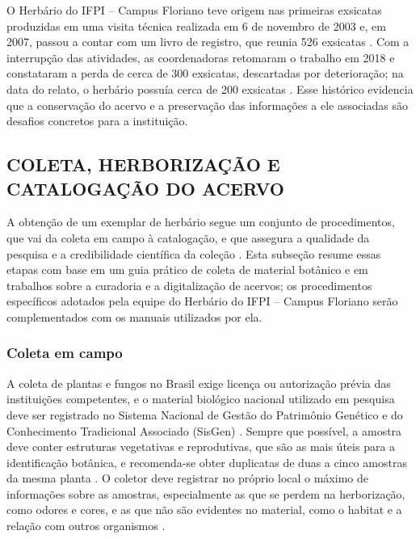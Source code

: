\documentclass[
    12pt,        %
    openany,     %
    oneside,     %
    a4paper,     %
    english,     %
    french,      %
    spanish,     %
    brazil,      %
    article      %
]{abntex2}
\begin{document}
O Herbário do IFPI -- Campus Floriano teve origem nas primeiras exsicatas produzidas em uma visita técnica realizada em 6 de novembro de 2003 e, em 2007, passou a contar com um livro de registro, que reunia 526 exsicatas \cite{lopes2023herbario}. Com a interrupção das atividades, as coordenadoras retomaram o trabalho em 2018 e constataram a perda de cerca de 300 exsicatas, descartadas por deterioração; na data do relato, o herbário possuía cerca de 200 exsicatas \cite{lopes2023herbario}. Esse histórico evidencia que a conservação do acervo e a preservação das informações a ele associadas são desafios concretos para a instituição.

\subsection{COLETA, HERBORIZAÇÃO E CATALOGAÇÃO DO ACERVO} 
\label{subsec:coleta-catalogacao}


A obtenção de um exemplar de herbário segue um conjunto de procedimentos, que vai da coleta em campo à catalogação, e que assegura a qualidade da pesquisa e a credibilidade científica da coleção \cite{freitas2021coleta}. Esta subseção resume essas etapas com base em um guia prático de coleta de material botânico e em trabalhos sobre a curadoria e a digitalização de acervos; os procedimentos específicos adotados pela equipe do Herbário do IFPI -- Campus Floriano serão complementados com os manuais utilizados por ela.

\subsubsection{Coleta em campo}

A coleta de plantas e fungos no Brasil exige licença ou autorização prévia das instituições competentes, e o material biológico nacional utilizado em pesquisa deve ser registrado no Sistema Nacional de Gestão do Patrimônio Genético e do Conhecimento Tradicional Associado (SisGen) \cite{freitas2021coleta}. Sempre que possível, a amostra deve conter estruturas vegetativas e reprodutivas, que são as mais úteis para a identificação botânica, e recomenda-se obter duplicatas de duas a cinco amostras da mesma planta \cite{freitas2021coleta}. O coletor deve registrar no próprio local o máximo de informações sobre as amostras, especialmente as que se perdem na herborização, como odores e cores, e as que não são evidentes no material, como o habitat e a relação com outros organismos \cite{freitas2021coleta}.
\end{document}
